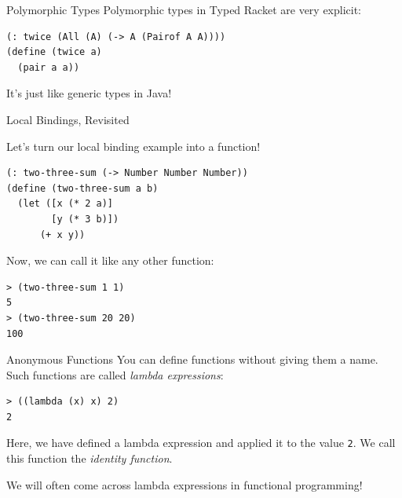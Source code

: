 \documentclass{beamer}
\begin{document}
\begin{frame}[fragile]{Polymorphic Types}
Polymorphic types in Typed Racket are very explicit:

\begin{lstlisting}
(: twice (All (A) (-> A (Pairof A A))))
(define (twice a)
  (pair a a))
\end{lstlisting}

\pause{}

\vspace{0.5cm}


\vspace{1cm}

\pause{}

It's just like generic types in Java!
\end{frame}

\begin{frame}[fragile]{Local Bindings, Revisited}

Let's turn our local binding example into a function!

\begin{lstlisting}
(: two-three-sum (-> Number Number Number))
(define (two-three-sum a b)
  (let ([x (* 2 a)]
        [y (* 3 b)])
      (+ x y))
\end{lstlisting}

\pause{}

Now, we can call it like any other function:

\begin{lstlisting}
> (two-three-sum 1 1)
5
> (two-three-sum 20 20)
100
\end{lstlisting}
\end{frame}

\begin{frame}[fragile]{Anonymous Functions}
You can define functions without giving them a name. Such functions are called \textit{lambda expressions}:

\begin{lstlisting}
> ((lambda (x) x) 2)
2
\end{lstlisting}

\pause{}

Here, we have defined a lambda expression and applied it to the value \lstinline{2}. We call this function  the \textit{identity function}.

\pause{}

\vspace{1cm}

We will often come across lambda expressions in functional programming!
\end{frame}
\end{document}
